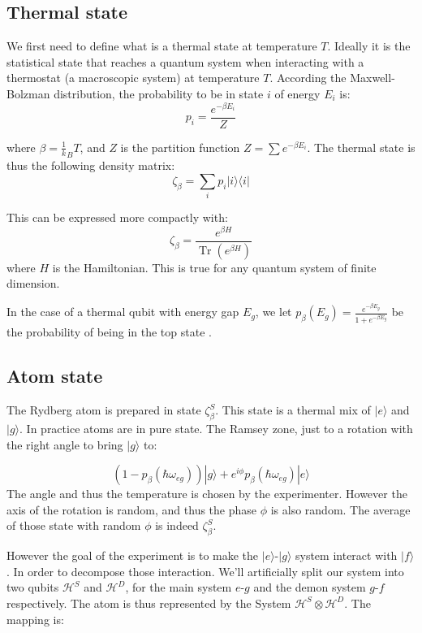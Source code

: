 \documentclass[10pt]{report}
\theoremstyle{plain}
\theoremstyle{definition}
\theoremstyle{remark}
\newcommand{\ket}[1]{|#1\rangle}
\newcommand{\bra}[1]{\langle#1|}
\DeclareMathOperator{\Tr}{Tr}
\newcommand{\trnorm}[1]{\frac{#1}{\Tr\left({#1}\right)}}
\begin{document}
\subsection{Thermal state}

We first need to define what is a thermal state at temperature $T$. Ideally it
is the statistical state that
reaches a quantum system when interacting with a thermostat
(a macroscopic system) at temperature $T$. According the Maxwell-Bolzman
distribution, the probability to be in state $i$ of energy $E_i$ is:
\[p_i = \frac {e^{-\beta E_i}} Z\]

where $\beta = \frac 1 k_B T$, and $Z$ is the partition function $Z = \sum
e^{-\beta E_i}$. The thermal state is thus the following density matrix:
\[\zeta_\beta = \sum_i p_i \ket i \bra i\]

This can be expressed more compactly with:
\begin{equation}
  \zeta_\beta = \trnorm{e^{\beta H}}
\end{equation}
where $H$ is the Hamiltonian. This is true for any quantum system of finite dimension.

In the case of a thermal qubit with energy gap $E_g$, we let $p_\beta(E_g) =\frac
{e^{-\beta E_g}}{1 + e^{-\beta E_g}} $ be the probability of being in the top state .

\subsection{Atom state}

The Rydberg atom is prepared in state $\zeta_\beta^S$. This state is a thermal
mix of $\ket e$ and $\ket g$. In practice atoms are in pure state. The Ramsey
zone, just to a rotation with the right angle to bring $\ket g$ to:

\[(1-p_\beta(\hbar \omega_{eg}))\ket g +
e^{i\phi}p_\beta(\hbar \omega_{eg}) \ket e\]
The angle and thus the temperature is chosen by the experimenter. However the
axis of the rotation is random, and thus the phase $\phi$ is also random. The
average of those state with random $\phi$ is indeed $\zeta_\beta^S$.

However the goal of the experiment is to make the $\ket e$-$\ket g$ system
interact with $\ket f$. In order to decompose those interaction. We'll
artificially split our system into two qubits $\mathcal{H}^S$ and $\mathcal{H}^D$, for the
main system $e$-$g$ and the demon system $g$-$f$ respectively. The atom is thus
represented by the System $\mathcal{H}^S \otimes \mathcal{H}^D$. The mapping is:
\end{document}
